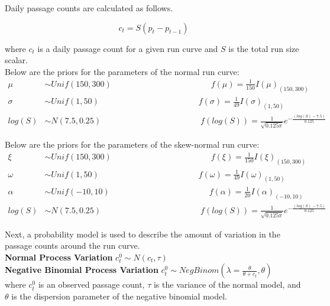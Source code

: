 \documentclass[12pt]{article}\usepackage[]{graphicx}\usepackage[]{color}
\begin{document}
\noindent Daily passage counts are calculated as follows.

$$c_t = S(p_t - p_{t-1})$$

\noindent where $c_t$ is a daily passage count for a given run curve and $S$ is the total run size scalar. \\

\noindent Below are the priors for the parameters of the normal run curve:
\begin{align*}
\mu &\sim Unif(150, 300) \hspace{2in} f(\mu) = \frac{1}{150} I(\mu)_{(150, 300)} \\
\sigma &\sim Unif(1, 50) \hspace{2in} f(\sigma) = \frac{1}{49} I(\sigma)_{(1, 50)} \\
log(S) &\sim N(7.5, 0.25) \hspace{2in} 
f(log(S)) = \frac{1}{\sqrt{0.125\pi}}e^{-\frac{(log(S)-7.5)}{0.125}}  
\end{align*}

\noindent Below are the priors for the parameters of the skew-normal run curve:
\begin{align*}
\xi &\sim Unif(150, 300) \hspace{2in} f(\xi) = \frac{1}{150} I(\xi)_{(150, 300)} \\
\omega &\sim Unif(1, 50) \hspace{2in} f(\omega) = \frac{1}{49} I(\omega)_{(1, 50)} \\
\alpha &\sim Unif(-10, 10) \hspace{2in} f(\alpha) = \frac{1}{20} I(\alpha)_{(-10, 10)} \\
log(S) &\sim N(7.5, 0.25) \hspace{2in} 
f(log(S)) = \frac{1}{\sqrt{0.125\pi}}e^{-\frac{(log(S)-7.5)}{0.125}}  
\end{align*}

\noindent Next, a probability model is used to describe the amount of variation in the passage counts around the run curve. \\

{\bf Normal Process Variation}  \hfill  $c_t^0 \sim N(c_t, \tau)$ \\

{\bf Negative Binomial Process Variation} \hfill $c_t^0 \sim NegBinom(\lambda = \frac{\theta}{\theta + c_t}, \theta)$ \\

\noindent where $c_t^0$ is an observed passage count, $\tau$ is the variance of the normal model, and $\theta$ is the dispersion parameter of the negative binomial model. \\
\end{document}
